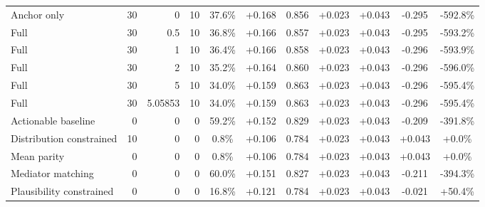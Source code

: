\begin{table}[htbp]
\begin{tabular}{lrrrccccccc}
Anchor only & 30 & 0 & 10 & 37.6\% & +0.168 & 0.856 & +0.023 & +0.043 & -0.295 & -592.8\% \\
Full & 30 & 0.5 & 10 & 36.8\% & +0.166 & 0.857 & +0.023 & +0.043 & -0.295 & -593.2\% \\
Full & 30 & 1 & 10 & 36.4\% & +0.166 & 0.858 & +0.023 & +0.043 & -0.296 & -593.9\% \\
Full & 30 & 2 & 10 & 35.2\% & +0.164 & 0.860 & +0.023 & +0.043 & -0.296 & -596.0\% \\
Full & 30 & 5 & 10 & 34.0\% & +0.159 & 0.863 & +0.023 & +0.043 & -0.296 & -595.4\% \\
Full & 30 & 5.05853 & 10 & 34.0\% & +0.159 & 0.863 & +0.023 & +0.043 & -0.296 & -595.4\% \\
Actionable baseline & 0 & 0 & 0 & 59.2\% & +0.152 & 0.829 & +0.023 & +0.043 & -0.209 & -391.8\% \\
Distribution constrained & 10 & 0 & 0 & 0.8\% & +0.106 & 0.784 & +0.023 & +0.043 & +0.043 & +0.0\% \\
Mean parity & 0 & 0 & 0 & 0.8\% & +0.106 & 0.784 & +0.023 & +0.043 & +0.043 & +0.0\% \\
Mediator matching & 0 & 0 & 0 & 60.0\% & +0.151 & 0.827 & +0.023 & +0.043 & -0.211 & -394.3\% \\
Plausibility constrained & 0 & 0 & 0 & 16.8\% & +0.121 & 0.784 & +0.023 & +0.043 & -0.021 & +50.4\% \\
\bottomrule
\end{tabular}
\end{table}